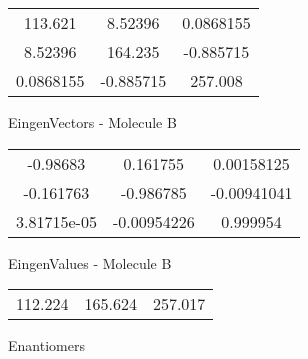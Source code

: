 \begin{multicols}{2}
\begin{center}
\begin{tabular}{|c c c|}
113.621	 & 	8.52396	 & 	0.0868155	 \\
8.52396	 & 	164.235	 & 	-0.885715	 \\
0.0868155	 & 	-0.885715	 & 	257.008
\end{tabular}

\vtab
 EingenVectors - Molecule B     \\
\vtab
\begin{tabular}{|c c c|}
-0.98683	 & 	0.161755	 & 	0.00158125	 \\
-0.161763	 & 	-0.986785	 & 	-0.00941041	 \\
3.81715e-05	 & 	-0.00954226	 & 	0.999954
\end{tabular}

\vtab
 EingenValues - Molecule B     \\
\vtab
\begin{tabular}{|c c c|}
112.224	 & 	165.624	 & 	257.017	 \\
\end{tabular}

\end{center}
\end{multicols}
\begin{center}
\vtab
\vtab
\textcolor{NavyBlue}{\Large Enantiomers}
\end{center}

 \newpage

